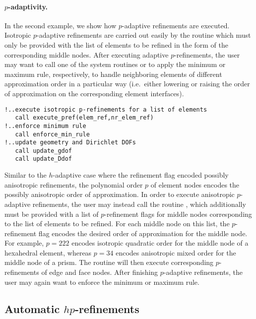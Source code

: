 \paragraph{$p$-adaptivity.}
In the second example, we show how $p$-adaptive refinements are executed. Isotropic $p$-adaptive refinements are carried out easily by the routine  which must only be provided with the list of elements to be refined in the form of the corresponding middle nodes. After executing adaptive $p$-refinements, the user may want to call one of the system routines  or  to apply the minimum or maximum rule, respectively, to handle neighboring elements of different approximation order in a particular way (i.e.~either lowering or raising the order of approximation on the corresponding element interfaces).

\begin{lstlisting}[caption=Isotropic $p$-adaptive refinements., label={lst:adaptive_refinement_element_loop4}]
!..execute isotropic p-refinements for a list of elements
   call execute_pref(elem_ref,nr_elem_ref)
!..enforce minimum rule
   call enforce_min_rule
!..update geometry and Dirichlet DOFs
   call update_gdof
   call update_Ddof
\end{lstlisting}

Similar to the $h$-adaptive case where the refinement flag encoded possibly anisotropic refinements, the polynomial order $p$ of element nodes encodes the possibly anisotropic order of approximation. In order to execute anisotropic $p$-adaptive refinements, the user may instead call the routine , which additionally must be provided with a list of $p$-refinement flags for middle nodes corresponding to the list of elements to be refined. For each middle node on this list, the $p$-refinement flag encodes the desired order of approximation for the middle node. For example, $p=222$ encodes isotropic quadratic order for the middle node of a hexahedral element, whereas $p=34$ encodes anisotropic mixed order for the middle node of a prism. The routine will then execute corresponding $p$-refinements of edge and face nodes. After finishing $p$-adaptive refinements, the user may again want to enforce the minimum or maximum rule.


\subsection{Automatic $hp$-refinements}
\label{sec:automatic-hp-refinements}


